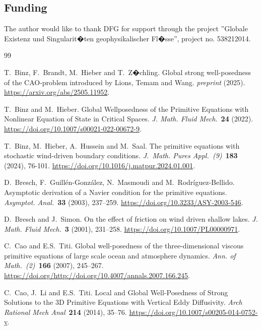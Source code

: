 \documentclass[preprint]{elsarticle}
\numberwithin{equation}{section}
\begin{document}
\subsection*{Funding}

The author would like to thank DFG for support through the project ''Globale Existenz und Singularit�ten geophysikalischer Fl�sse'', project no. 538212014.

\bigskip 
%
%

\begin{thebibliography}{99}
	
	
	T.~Binz, F.~Brandt, M.~Hieber and T.~Z�chling.
	Global strong well-posedness of the CAO-problem introduced by Lions, Temam and Wang.  
	\textit{preprint} (2025). 
	\url{https://arxiv.org/abs/2505.11952}.
	
	T.~Binz and M.~Hieber.
	Global Wellposedness of the Primitive Equations with Nonlinear Equation of State in Critical Spaces.  
	\textit{J. Math. Fluid Mech.}~\textbf{24} (2022). 
	\url{https://doi.org/10.1007/s00021-022-00672-9}.
	
	T.~Binz, M.~Hieber, A.~Hussein and M.~Saal.
	The primitive equations with stochastic wind-driven boundary conditions. 
	\textit{J.~Math. Pures Appl.~(9)}~\textbf{183} (2024), 76-101. 
	\url{https://doi.org/10.1016/j.matpur.2024.01.001}.
	
	D.~Bresch, F.~Guill\'en-Gonz\'alez, N.~Masmoudi and M.~Rodr\'iguez-Bellido.  
	Asymptotic derivation of a Navier condition for the primitive equations.  
	\textit{Asymptot. Anal.}~\textbf{33} (2003), 237--259.
	\url{https://doi.org/10.3233/ASY-2003-546}.
	
	D.~Bresch and J.~Simon. 
	On the effect of friction on wind driven shallow lakes.
	\textit{J. Math. Fluid Mech.}~\textbf{3} (2001), 231--258.
	\url{https://doi.org/10.1007/PL00000971}. 
	
	C.~Cao and E.S.~Titi. 
	Global well-posedness of the three-dimensional viscous primitive equations of large scale ocean and atmosphere dynamics.
	\textit{Ann. of Math.~(2)}~\textbf{166} (2007), 245--267. 
	\url{https://doi.org/http://doi.org/10.4007/annals.2007.166.245}.
	
	C.~Cao, J.~Li and E.S.~Titi. 
	Local and Global Well-Posedness of Strong Solutions to the 3D Primitive Equations with Vertical Eddy Diffusivity.
	\textit{Arch Rational Mech Anal}~\textbf{214} (2014), 35--76. 
	\url{https://doi.org/10.1007/s00205-014-0752-y}.
	

\end{thebibliography}
\end{document}
